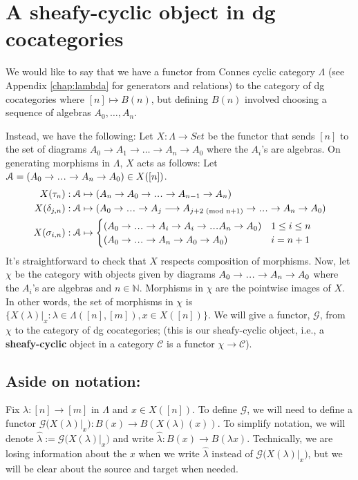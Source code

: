 \section{A sheafy-cyclic object in dg cocategories}\label{sec:cyclic_B(n)}
We would like to say that we have a functor 
from Connes cyclic category $\Lambda$ 
(see Appendix \ref{chap:lambda} for 
generators and relations) to the category of dg 
cocategories where $[n] \mapsto B(n)$, 
but defining $B(n)$ involved choosing a 
sequence of algebras $A_0, \dots, A_n$. 

Instead, we have the following: 
Let $X: \Lambda \to Set$ be the functor 
that sends $[n]$ to the set of diagrams 
$A_0 \to A_1 \to \dots \to A_n \to A_0$ 
where the $A_i$'s are algebras. On 
generating morphisms in $\Lambda$, 
$X$ acts as follows: Let $\mathcal{A} = 
(A_0 \to \smdots \to A_n \to A_0)
\in X([n])$. 
\begin{align*}
X(\tau_n): \mathcal{A}
  &\mapsto (A_n \to A_0 \to \smdots \to A_{n-1} \to A_n)\\
X(\delta_{j,n}): \mathcal{A}
  &\mapsto 
    (A_0 \to \smdots \to A_j\longrightarrow A_{j+2 
    \textrm{ (mod n+1)}} \to \smdots \to A_n \to A_0) \\
X(\sigma_{i,n}): \mathcal{A}
  &\mapsto 
  \begin{cases}
    (A_0 \to \smdots \to 
  		   A_i \to A_i \to \smdots A_n \to A_0)
    & 1 \leq i \leq n\\
    (A_0 \to \smdots \to A_n \to A_0 \to A_0)
    & i=n+1	
  \end{cases}	   
\end{align*}
It's straightforward to 
check that $X$ respects composition of morphisms. 
Now, let $\chi$ be the category with objects given by
diagrams $A_0 \to \smdots \to A_n \to A_0$ 
where the $A_i$'s are algebras and $n \in \mathbb{N}$. 
Morphisms in $\chi$ are the pointwise images of 
$X$. In other words, the set of morphisms in
$\chi$ is $\{ X(\lambda)|_x: \lambda \in 
\Lambda([n],[m]), x \in X([n]) \}$. We will give 
a functor, $\mathcal{G}$, from $\chi$ to the 
category of dg 
cocategories; (this is our sheafy-cyclic object, 
i.e., a \textbf{sheafy-cyclic} object in a 
category $\mathcal{C}$ is a functor $\chi \to 
\mathcal{C}$).
%
\subsection{Aside on notation:} 
Fix $\lambda:[n] \to [m]$ in $\Lambda$ 
and $x \in X([n])$. To define $\mathcal{G}$, 
we will need to define a functor $\mathcal{G}
\big(X(\lambda)|_x \big): B(x) \to B(X(\lambda)(x))$. 
To simplify notation, we will denote 
$\hat{\lambda} := \mathcal{G}
\big(X(\lambda)|_x \big)$ and write 
$\hat{\lambda}: B(x) \to B(\lambda x)$. 
Technically, we are losing information 
about the $x$ when we write 
$\hat{\lambda}$ instead of $\mathcal{G}
\big(X(\lambda)|_x \big)$, but 
we will be clear 
about the source and target when needed.
%

